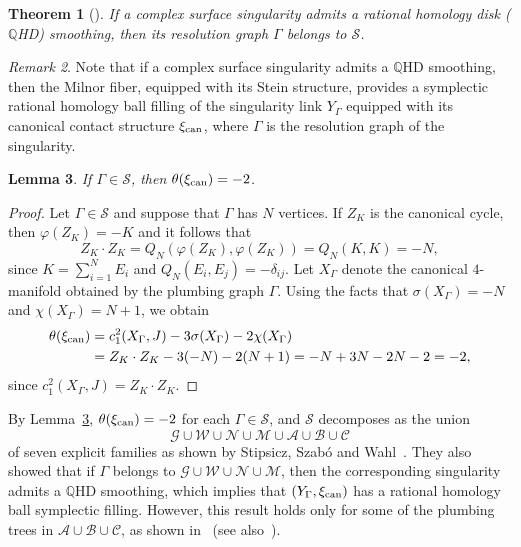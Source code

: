\documentclass[11pt]{amsart}
\theoremstyle{plain}
\newtheorem{theorem}{Theorem}[section]
\newtheorem{lemma}[theorem]{Lemma}
\theoremstyle{definition}
\theoremstyle{remark}
\newtheorem{remark}[theorem]{Remark}
\newcommand{\Q}{\mathbb{Q}}
\begin{document}
\begin{theorem}[{\cite[Corollary~2.5]{StipsiczSzaboWahl08}}]
If a complex surface singularity admits a rational homology disk
($\Q$HD) smoothing, then its resolution graph $\Gamma$ belongs to
$\mathcal{S}$.
\end{theorem}

\begin{remark}
Note that if a complex surface singularity admits a $\Q$HD smoothing,
then the Milnor fiber, equipped with its Stein structure, provides a
symplectic rational homology ball filling of the singularity link
$Y_\Gamma$ equipped with its canonical contact structure
$\xi_{\rm can}$, where $\Gamma$ is the resolution graph of the
singularity.
\end{remark}

\begin{lemma}\label{lem:symp}
If $\Gamma\in\mathcal{S}$, then $\theta(\xi_{\rm can})=-2$.
\end{lemma}

\begin{proof}
Let $\Gamma\in\mathcal{S}$ and suppose that $\Gamma$ has $N$ vertices.
If $Z_K$ is the canonical cycle, then $\varphi(Z_K)=-K$ and it follows
that
\[
Z_K\cdot Z_K=Q_N(\varphi(Z_K),\varphi(Z_K))=Q_N(K,K)=-N,
\]
since $K=\sum_{i=1}^N E_i$ and $Q_N(E_i,E_j)=-\delta_{ij}$. Let
$X_\Gamma$ denote the canonical $4$-manifold obtained by the plumbing
graph $\Gamma$. Using the facts that $\sigma(X_\Gamma)=-N$ and
$\chi(X_\Gamma)=N+1$, we obtain
\begin{equation}\label{eq-theta}
\begin{split}
\theta(\xi_{\rm can})
&=c_1^2(X_\Gamma,J)-3\sigma(X_\Gamma)-2\chi(X_\Gamma)\\
&=Z_K\cdot Z_K-3(-N)-2(N+1)=-N+3N-2N-2=-2,
\end{split}
\end{equation}
since $c_1^2(X_\Gamma,J)=Z_K\cdot Z_K$.
\end{proof}

By Lemma~\ref{lem:symp}, $\theta(\xi_{\rm can})=-2$ for each
$\Gamma\in\mathcal{S}$, and $\mathcal{S}$ decomposes as the union
\[
\mathcal{G}\cup\mathcal{W}\cup\mathcal{N}\cup\mathcal{M}\cup\mathcal{A}\cup\mathcal{B}\cup\mathcal{C}
\]
of seven explicit families as shown by Stipsicz, Szab\'{o} and
Wahl~\cite{StipsiczSzaboWahl08}. They also showed that if $\Gamma$
belongs to $\mathcal{G}\cup\mathcal{W}\cup\mathcal{N}\cup\mathcal{M}$,
then the corresponding singularity admits a $\Q$HD smoothing, which
implies that $(Y_\Gamma,\xi_{\rm can})$ has a rational homology
ball symplectic filling. However, this result holds only for some of the plumbing trees in
$\mathcal{A}\cup\mathcal{B}\cup\mathcal{C}$, as shown
in~\cite{BhupalStipsicz11} (see also~\cite{Beke25}). 
\end{document}
